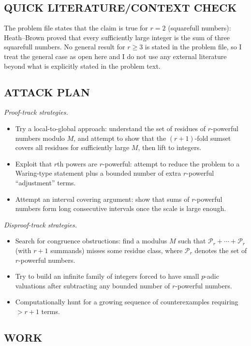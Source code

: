 \subsection*{QUICK LITERATURE/CONTEXT CHECK}
The problem file states that the claim is true for $r=2$ (squarefull numbers): Heath--Brown proved that every sufficiently large integer is the sum of three squarefull numbers.
No general result for $r\ge 3$ is stated in the problem file, so I treat the general case as open here and I do not use any external literature beyond what is explicitly stated in the problem text.

\subsection*{ATTACK PLAN}
\emph{Proof-track strategies.}
\begin{itemize}
\item Try a local-to-global approach: understand the set of residues of $r$-powerful numbers modulo $M$, and attempt to show that the $(r+1)$-fold sumset covers all residues for sufficiently large $M$, then lift to integers.
\item Exploit that $r$th powers are $r$-powerful: attempt to reduce the problem to a Waring-type statement plus a bounded number of extra $r$-powerful ``adjustment'' terms.
\item Attempt an interval covering argument: show that sums of $r$-powerful numbers form long consecutive intervals once the scale is large enough.
\end{itemize}

\emph{Disproof-track strategies.}
\begin{itemize}
\item Search for congruence obstructions: find a modulus $M$ such that $\mathcal{P}_r+\cdots+\mathcal{P}_r$ (with $r+1$ summands) misses some residue class, where $\mathcal{P}_r$ denotes the set of $r$-powerful numbers.
\item Try to build an infinite family of integers forced to have small $p$-adic valuations after subtracting any bounded number of $r$-powerful numbers.
\item Computationally hunt for a growing sequence of counterexamples requiring $>r+1$ terms.
\end{itemize}

\subsection*{WORK}
